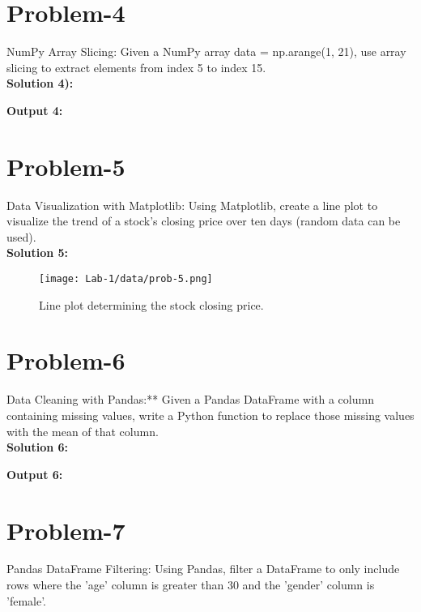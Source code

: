 \section{Problem-4}
NumPy Array Slicing: Given a NumPy array data = np.arange(1, 21), use array slicing to extract elements from index 5 to index 15.\\

\textbf{Solution 4): }


\textbf{Output 4:}
\\

\section{Problem-5}
Data Visualization with Matplotlib: Using Matplotlib, create a line plot to visualize the trend of a stock’s closing price over ten days (random data can be used).\\

\textbf{Solution 5: }


\begin{figure}[ht]
\centering
\texttt{[image: Lab-1/data/prob-5.png]}
\caption{Line plot determining the stock closing price.}
\label{fig:sample}
\end{figure}

\section{Problem-6}
Data Cleaning with Pandas:** Given a Pandas DataFrame with a column containing missing values, write a Python function to replace those missing values with the mean of that column.\\

\textbf{Solution 6: }


\textbf{Output 6: }
\\

\section{Problem-7}
Pandas DataFrame Filtering: Using Pandas, filter a DataFrame to only include rows where the ’age’ column is greater than 30 and the ’gender’ column is ’female’.\\

